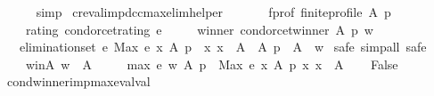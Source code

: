 \begin{isabellebody}
\ \ \ \ \isamarkupfalse%
\ simp\isanewline
{}\isamarkupfalse%
%
\endisatagproof
{\isafoldproof}%
%
\isadelimproof
\isanewline
%
\endisadelimproof
\isanewline
{}\isamarkupfalse%
\ cr{\isacharunderscore}{\kern0pt}eval{\isacharunderscore}{\kern0pt}imp{\isacharunderscore}{\kern0pt}dcc{\isacharunderscore}{\kern0pt}max{\isacharunderscore}{\kern0pt}elim{\isacharunderscore}{\kern0pt}helper{}{\isacharcolon}{\kern0pt}\isanewline
\ \ \isanewline
\ \ \ \ f{\isacharunderscore}{\kern0pt}prof{\isacharcolon}{\kern0pt}\ {\isachardoublequoteopen}finite{\isacharunderscore}{\kern0pt}profile\ A\ p{\isachardoublequoteclose}\ \isanewline
\ \ \ \ rating{\isacharcolon}{\kern0pt}\ {\isachardoublequoteopen}condorcet{\isacharunderscore}{\kern0pt}rating\ e{\isachardoublequoteclose}\ \isanewline
\ \ \ \ winner{\isacharcolon}{\kern0pt}\ {\isachardoublequoteopen}condorcet{\isacharunderscore}{\kern0pt}winner\ A\ p\ w{\isachardoublequoteclose}\isanewline
\ \ \ {\isachardoublequoteopen}elimination{\isacharunderscore}{\kern0pt}set\ e\ {\isacharparenleft}{\kern0pt}Max\ {\isacharbraceleft}{\kern0pt}e\ x\ A\ p\ {\isacharbar}{\kern0pt}\ x{\isachardot}{\kern0pt}\ x\ {\isasymin}\ A{\isacharbraceright}{\kern0pt}{\isacharparenright}{\kern0pt}\ {\isacharparenleft}{\kern0pt}{\isacharless}{\kern0pt}{\isacharparenright}{\kern0pt}\ A\ p\ {\isacharequal}{\kern0pt}\ A\ {\isacharminus}{\kern0pt}\ {\isacharbraceleft}{\kern0pt}w{\isacharbraceright}{\kern0pt}{\isachardoublequoteclose}\isanewline
%
\isadelimproof
%
\endisadelimproof
%
\isatagproof
{}\isamarkupfalse%
\ {\isacharparenleft}{\kern0pt}safe{\isacharcomma}{\kern0pt}\ simp{\isacharunderscore}{\kern0pt}all{\isacharcomma}{\kern0pt}\ safe{\isacharparenright}{\kern0pt}\isanewline
\ \ \isamarkupfalse%
\isanewline
\ \ \ \ w{\isacharunderscore}{\kern0pt}in{\isacharunderscore}{\kern0pt}A{\isacharcolon}{\kern0pt}\ {\isachardoublequoteopen}w\ {\isasymin}\ A{\isachardoublequoteclose}\ \isanewline
\ \ \ \ max{\isacharcolon}{\kern0pt}\ {\isachardoublequoteopen}e\ w\ A\ p\ {\isacharless}{\kern0pt}\ Max\ {\isacharbraceleft}{\kern0pt}e\ x\ A\ p\ {\isacharbar}{\kern0pt}x{\isachardot}{\kern0pt}\ x\ {\isasymin}\ A{\isacharbraceright}{\kern0pt}{\isachardoublequoteclose}\isanewline
\ \ \isamarkupfalse%
\ {\isachardoublequoteopen}False{\isachardoublequoteclose}\isanewline
\ \ \ \ \isamarkupfalse%
\ cond{\isacharunderscore}{\kern0pt}winner{\isacharunderscore}{\kern0pt}imp{\isacharunderscore}{\kern0pt}max{\isacharunderscore}{\kern0pt}eval{\isacharunderscore}{\kern0pt}val\isanewline

\end{isabellebody}
